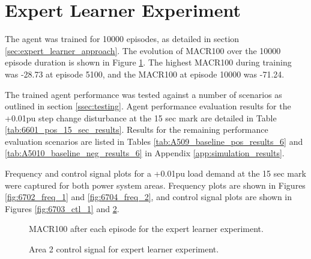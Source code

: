 \section{Expert Learner Experiment}
The agent was trained for 10000 episodes, as detailed in section \ref{sec:expert_learner_approach}. The evolution of MACR100 over the 10000 episode duration is shown in Figure \ref{fig:6701_average_reward}. The highest MACR100 during training was -28.73 at episode 5100, and the MACR100 at episode 10000 was -71.24.

The trained agent performance was tested against a number of scenarios as outlined in section \ref{ssec:testing}. Agent performance evaluation results for the +0.01pu step change disturbance at the 15 sec mark are detailed in Table \ref{tab:6601_pos_15_sec_results}. Results for the remaining performance evaluation scenarios are listed in Tables \ref{tab:A509_baseline_pos_results_6} and \ref{tab:A5010_baseline_neg_results_6} in Appendix \ref{app:simulation_results}.

Frequency and control signal plots for a +0.01pu load demand at the 15 sec mark were captured for both power system areas. Frequency plots are shown in Figures \ref{fig:6702_freq_1} and \ref{fig:6704_freq_2}, and control signal plots are shown in Figures \ref{fig:6703_ctl_1} and \ref{fig:6705_ctl_2}.

\begin{figure}[h]
	\centering
	
	\caption{MACR100 after each episode for the expert learner experiment.}\label{fig:6701_average_reward}
\end{figure}



\begin{figure}[h]
	\centering
	
	
	\vspace{-0.5cm}
	\caption{Area 1 frequency response for expert learner experiment.}\label{fig:6702_freq_1}
	
	\vspace{0.5cm}
	
	
	\vspace{-0.5cm}
	\caption{Area 1 control signal for expert learner experiment.}\label{fig:6703_ctl_1}
	
	\vspace{0.5cm}
	
	
	\vspace{-0.5cm}
	\caption{Area 2 frequency response for expert learner experiment.}\label{fig:6704_freq_2}
	
	\vspace{0.5cm}
				
	
	\vspace{-0.5cm}
	\caption{Area 2 control signal for expert learner experiment.}\label{fig:6705_ctl_2}
\end{figure}